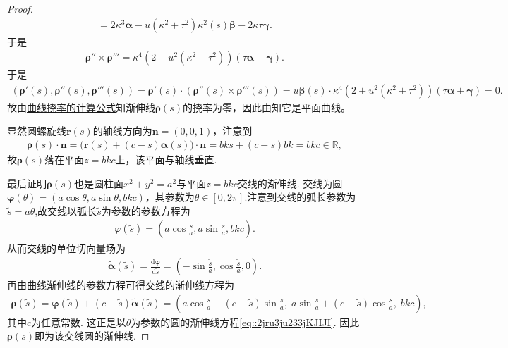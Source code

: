 \documentclass[../../main.tex]{subfiles}%
\begin{document}
\begin{proof}
\begin{gather*}
=2\kappa^3\bm{\alpha}-u(\kappa^2+\tau^2)\kappa^2(s)\bm{\beta}-2\kappa\tau\bm{\gamma}.
\end{gather*}
于是
\begin{align*}
\bm{\rho}''\times\bm{\rho}''' = \kappa^4\!\left(2+u^2(\kappa^2+\tau^2)\right)(\tau\bm{\alpha}+\bm{\gamma}).
\end{align*}
于是
\begin{align*}
\left( \boldsymbol{\rho }' \left( s \right) ,\boldsymbol{\rho }'' \left( s \right) ,\boldsymbol{\rho }''' \left( s \right) \right) =\boldsymbol{\rho }' \left( s \right) \cdot \left( \boldsymbol{\rho }'' \left( s \right) \times \boldsymbol{\rho }''' \left( s \right) \right) =u\boldsymbol{\beta }\left( s \right) \cdot \kappa ^4\!\left( 2+u^2(\kappa ^2+\tau ^2) \right) (\tau \boldsymbol{\alpha }+\boldsymbol{\gamma })=0.
\end{align*}
故由\hyperref[theorem:微分几何-曲线挠率的计算公式]{曲线挠率的计算公式}知渐伸线$\bm{\rho}(s)$的挠率为零，因此由知它是平面曲线。

显然圆螺旋线$\bm{r}(s)$的轴线方向为$\bm{n}=(0,0,1)$，注意到
\begin{align*}
\bm{\rho}(s)\cdot\bm{n}= \bigl(\bm{r}(s)+(c-s)\bm{\alpha}(s)\bigr)\cdot\bm{n}=bks+(c-s)bk=bkc\in \mathbb{R},
\end{align*}
故$\bm{\rho}(s)$落在平面$z=bkc$上，该平面与轴线垂直.

最后证明$\bm{\rho}(s)$也是圆柱面$x^2+y^2=a^2$与平面$z=bkc$交线的渐伸线. 交线为圆$\bm{\varphi}(\theta)=(a\cos\theta,a\sin\theta,bkc)$，其参数为$\theta\in [0,2\pi]$.注意到交线的弧长参数为$\tilde{s}=a\theta$,故交线以弧长$\tilde{s}$为参数的参数方程为
\begin{align*}
\varphi(\tilde{s})=(a\cos\frac{\tilde{s}}{a},a\sin\frac{\tilde{s}}{a},bkc).
\end{align*}
从而交线的单位切向量场为
\begin{align*}
\tilde{\bm{\alpha}}(\tilde{s})=\frac{\mathrm{d}\boldsymbol{\varphi }}{\mathrm{d}\tilde{s}}=(-\sin\frac{\tilde{s}}{a},\cos\frac{\tilde{s}}{a},0).
\end{align*}
再由\hyperref[theorem:微分几何-定理7.3]{曲线渐伸线的参数方程}可得交线的渐伸线方程为
\begin{align*}
\tilde{\bm{\rho}}(\tilde{s}) = \bm{\varphi}(\tilde{s}) + (c-\tilde{s})\tilde{\bm{\alpha}}(\tilde{s})
= \left(a\cos\frac{\tilde{s}}{a}-(c-\tilde{s})\sin\frac{\tilde{s}}{a},\; a\sin\frac{\tilde{s}}{a}+(c-\tilde{s})\cos\frac{\tilde{s}}{a},\; bkc\right),
\end{align*}
其中$c$为任意常数.
这正是以$\theta$为参数的圆的渐伸线方程\eqref{eq::2jru3ju233jKJIJI}. 因此$\bm{\rho}(s)$即为该交线圆的渐伸线.
\end{proof}
\end{document}
